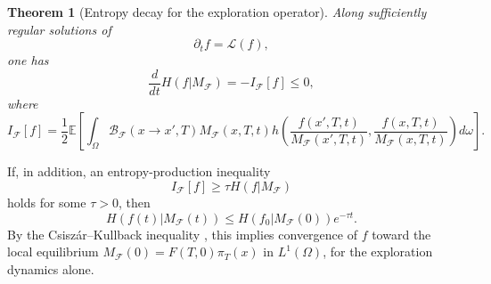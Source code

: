 \documentclass[10pt,a4paper]{article}
\theoremstyle{theorem}
\newtheorem{theorem}{Theorem}[section]
\numberwithin{equation}{section}
\begin{document}
\begin{theorem}[Entropy decay for the exploration operator]
Along sufficiently regular solutions of
\[
\partial_t f=\mathcal L(f),
\]
one has
\begin{equation}
\label{eq:SAentr_short}
\frac{d}{dt}H(f|M_{\mathcal F})
=
-I_{\mathcal F}[f]\le0,
\end{equation}
where
\begin{equation}
\label{eq:If}
I_{\mathcal F}[f]
=
\frac12\mathbb E\left[
\int_{\Omega}
\mathcal B_{\mathcal F}(x\rightarrow x',T)
M_{\mathcal F}(x,T,t)
h\left(
\frac{f(x',T,t)}{M_{\mathcal F}(x',T,t)},
\frac{f(x,T,t)}{M_{\mathcal F}(x,T,t)}
\right)d\omega
\right].
\end{equation}
\end{theorem}

If, in addition, an entropy-production inequality
\begin{equation}
\label{eq:entprod}
I_{\mathcal F}[f]\geq \tau H(f|M_{\mathcal F})
\end{equation}
holds for some \(\tau>0\), then
\begin{equation}
\label{eq:H_const}
H(f(t)|M_{\mathcal F}(t))
\le
H(f_0|M_{\mathcal F}(0))e^{-\tau t}.
\end{equation}
By the Csiszár--Kullback inequality
\cite{csiszar_information-type_1967,kullback_lower_1967}, this implies convergence
of \(f\) toward the local equilibrium \(M_{\mathcal F}(0)=F(T,0)\pi_T(x)\) in \(L^1(\Omega)\), for
the exploration dynamics alone.
\end{document}

